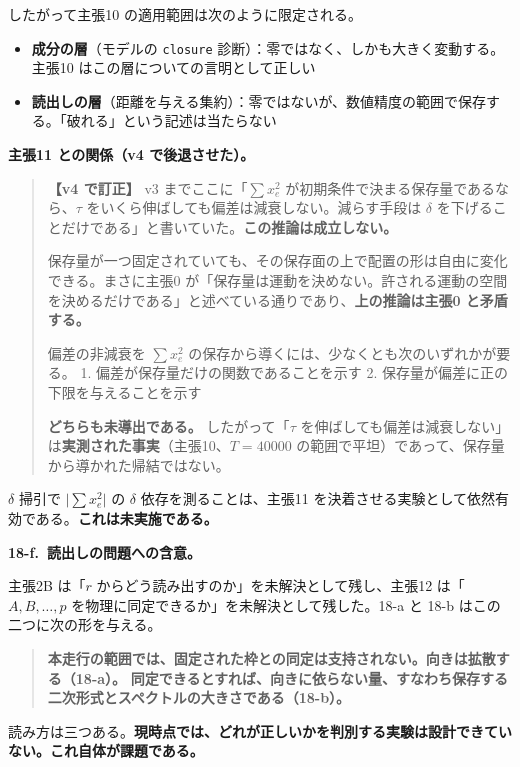 \documentclass[
  10pt,
]{ltjsarticle}
\providecommand{\tightlist}{%
  \setlength{\itemsep}{0pt}\setlength{\parskip}{0pt}}
\begin{document}
したがって主張10 の適用範囲は次のように限定される。

\begin{itemize}
\tightlist
\item
  \textbf{成分の層}（モデルの \texttt{closure}
  診断）：零ではなく、しかも大きく変動する。主張10
  はこの層についての言明として正しい
\item
  \textbf{読出しの層}（距離を与える集約）：零ではないが、数値精度の範囲で保存する。「破れる」という記述は当たらない
\end{itemize}

\textbf{主張11 との関係（v4 で後退させた）。}

\begin{quote}
\textbf{【v4 で訂正】} v3 までここに「\(\sum x_e^2\)
が初期条件で決まる保存量であるなら、\(\tau\)
をいくら伸ばしても偏差は減衰しない。減らす手段は \(\delta\)
を下げることだけである」と書いていた。\textbf{この推論は成立しない。}

保存量が一つ固定されていても、その保存面の上で配置の形は自由に変化できる。まさに主張0
が「保存量は運動を決めない。許される運動の空間を決めるだけである」と述べている通りであり、\textbf{上の推論は主張0
と矛盾する。}

偏差の非減衰を \(\sum x_e^2\)
の保存から導くには、少なくとも次のいずれかが要る。 1.
偏差が保存量だけの関数であることを示す 2.
保存量が偏差に正の下限を与えることを示す

\textbf{どちらも未導出である。} したがって「\(\tau\)
を伸ばしても偏差は減衰しない」は\textbf{実測された事実}（主張10、\(T=40000\)
の範囲で平坦）であって、保存量から導かれた帰結ではない。
\end{quote}

\(\delta\) 掃引で \(\lvert\sum x_e^2\rvert\) の \(\delta\)
依存を測ることは、主張11
を決着させる実験として依然有効である。\textbf{これは未実施である。}

\textbf{18-f.~読出しの問題への含意。}

主張2B は「\(r\) からどう読み出すのか」を未解決として残し、主張12
は「\(A,B,\dots,p\) を物理に同定できるか」を未解決として残した。18-a と
18-b はこの二つに次の形を与える。

\begin{quote}
\textbf{本走行の範囲では、固定された枠との同定は支持されない。向きは拡散する（18-a）。}
\textbf{同定できるとすれば、向きに依らない量、すなわち保存する二次形式とスペクトルの大きさである（18-b）。}
\end{quote}

読み方は三つある。\textbf{現時点では、どれが正しいかを判別する実験は設計できていない。これ自体が課題である。}
\end{document}

